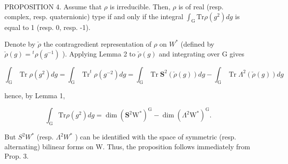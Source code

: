 PROPOSITION 4. Assume that \(\rho\) is irreducible. Then, \(\rho\) is of real (resp. complex, resp. quaternionic) type if and only if the integral \(\int_{\mathrm{G}} \mathrm{Tr} \rho(g^2) dg\) is equal to 1 (resp. 0, resp. -1).

Denote by \(\check{\rho}\) the contragredient representation of \(\rho\) on \(W^{*}\) (defined by \(\check{\rho}(g)={}^{t}\rho(g^{-1})\) ). Applying Lemma 2 to \(\check{\rho}(g)\) and integrating over G gives

\[
\int_ {\mathrm{G}} \operatorname{Tr} \rho (g ^ {2}) d g = \int_ {\mathrm{G}} \operatorname{Tr} ^ {t} \rho (g ^ {- 2}) d g = \int_ {\mathrm{G}} \operatorname{Tr} \mathbf {S} ^ {2} (\check {\rho} (g)) d g - \int_ {\mathrm{G}} \operatorname{Tr} \Lambda^ {2} (\check {\rho} (g)) d g
\]

hence, by Lemma 1,

\[
\int_ {\mathrm{G}} \mathrm{Tr} \rho (g ^ {2}) d g = \dim (\mathbf {S} ^ {2} \mathrm{W} ^ {*}) ^ {\mathrm{G}} - \dim (\Lambda^ {2} \mathrm{W} ^ {*}) ^ {\mathrm{G}}.
\]

But \(S^{2}W^{*}\) (resp. \(\Lambda^{2}W^{*}\) ) can be identified with the space of symmetric (resp. alternating) bilinear forms on W. Thus, the proposition follows immediately from Prop. 3.

